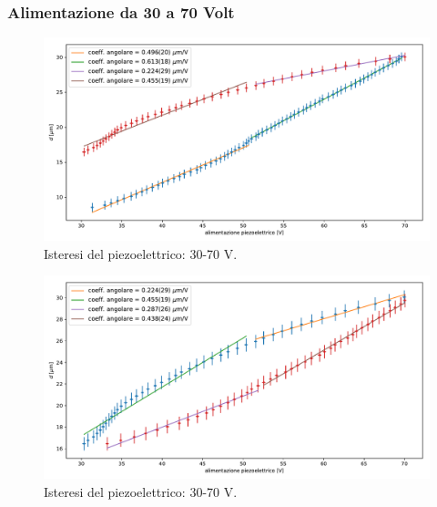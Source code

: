\documentclass[a4paper]{article}
\begin{document}
\begin{multicols}{2}

\subsubsection{Alimentazione da 30 a 70 Volt}

\end{multicols}

\begin{figure}[H]
	\includegraphics[width=1\textwidth]{isteresi_30-70-1.pdf}
	\caption{Isteresi del piezoelettrico: 30-70 V.}
	\label{fig:30-70-1}
\end{figure}

\begin{multicols}{2}

 
 \end{multicols}
 
 \begin{figure}[H]
 	\includegraphics[width=1\textwidth]{isteresi_30-70-2.pdf}
 	\caption{Isteresi del piezoelettrico: 30-70 V.}
 	\label{fig:30-70-2}
 \end{figure}
 
\end{document}

